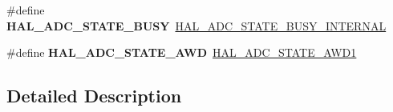 \begin{DoxyCompactItemize}
\#define {\bfseries H\+A\+L\+\_\+\+A\+D\+C\+\_\+\+S\+T\+A\+T\+E\+\_\+\+B\+U\+SY}~\mbox{\hyperlink{group___a_d_c___exported___types_ga7055248355e179ee208d23bd2ce8ba69}{H\+A\+L\+\_\+\+A\+D\+C\+\_\+\+S\+T\+A\+T\+E\+\_\+\+B\+U\+S\+Y\+\_\+\+I\+N\+T\+E\+R\+N\+AL}}
\item 
\mbox{\label{group___h_a_l___a_d_c___aliased___defines_ga3147b9039ee1bc08da805d57a5136cd1}} 
\#define {\bfseries H\+A\+L\+\_\+\+A\+D\+C\+\_\+\+S\+T\+A\+T\+E\+\_\+\+A\+WD}~\mbox{\hyperlink{group___a_d_c___exported___types_ga39ce295171a5e608097017fda4cfd7d5}{H\+A\+L\+\_\+\+A\+D\+C\+\_\+\+S\+T\+A\+T\+E\+\_\+\+A\+W\+D1}}
\end{DoxyCompactItemize}


\subsection{Detailed Description}

